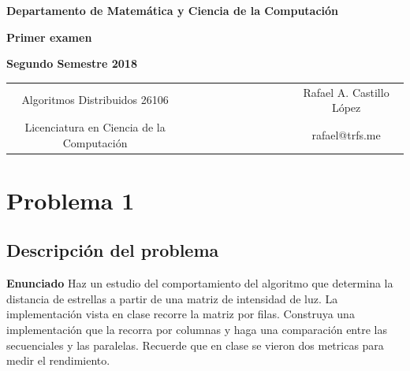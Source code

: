 \documentclass{report}
\begin{document}
\begin{titlepage}
\begin{center}
\end{center}
\begin{center}
{\bf Departamento de Matem\'atica y Ciencia de la Computaci\'on}
\end{center}
\vspace{3cm}
\begin{center}
%
%
{\Large \bf Primer examen}
%
%
\end{center}
\begin{center}
%
%
%
{\large \bf Segundo Semestre 2018}
%
%
\end{center}
\vspace{5cm}
\begin{tabular}{c l c}
%
%
%
Algoritmos Distribuidos 26106 & ~~~~~~~~~~~~~~~~~ & Rafael A. Castillo L\'opez \\
%
%
%
Licenciatura en Ciencia de la Computaci\'on & ~~ & rafael@trfs.me
%
%
\end{tabular}
\end{titlepage}

\chapter{Problema 1}

\section{Descripci\'on del problema}

\textbf{Enunciado} Haz un estudio del comportamiento del algoritmo que determina
la distancia de estrellas a partir de una matriz de intensidad de luz. La
implementaci\'on vista en clase recorre la matriz por filas. Construya una
implementaci\'on que la recorra por columnas y haga una comparaci\'on entre
las secuenciales y las paralelas. Recuerde que en clase se vieron dos metricas
para medir el rendimiento.
\end{document}
